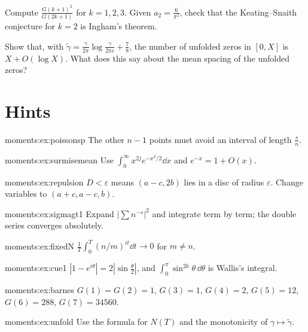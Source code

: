 \begin{exercise}[$\star$]\label{moments:ex:barnes}
Compute $\frac{G(k+1)^2}{G(2k+1)}$ for $k=1,2,3$. Given $a_2=\frac6{\pi^2}$, check that the Keating--Snaith conjecture for $k=2$ is Ingham's theorem.
\end{exercise}

\begin{exercise}[$\star\star$]\label{moments:ex:unfold}
Show that, with $\tilde\gamma=\frac\gamma{2\pi}\log\frac\gamma{2\pi e}+\frac78$, the number of unfolded zeros in $[0,X]$ is $X+O(\log X)$. What does this say about the
mean spacing of the unfolded zeros?
\end{exercise}

\section{Hints}

\begin{hint}{moments:ex:poissonsp}
The other $n-1$ points must avoid an interval of length $\frac sn$.
\end{hint}
\begin{hint}{moments:ex:surmisemean}
Use $\int_0^\infty x^{2j}e^{-x^2/2}\dd x$ and $e^{-x}=1+O(x)$.
\end{hint}
\begin{hint}{moments:ex:repulsion}
$D<\varepsilon$ means $(a-c,2b)$ lies in a disc of radius $\varepsilon$. Change variables to $(a+c,a-c,b)$.
\end{hint}
\begin{hint}{moments:ex:sigmagt1}
Expand $|\sum n^{-s}|^2$ and integrate term by term; the double series converges absolutely.
\end{hint}
\begin{hint}{moments:ex:fixedN}
$\frac1T\int_0^T(n/m)^{it}\dd t\to0$ for $m\ne n$.
\end{hint}
\begin{hint}{moments:ex:cue1}
$|1-e^{i\theta}|=2|\sin\frac\theta2|$, and $\int_0^\pi\sin^{2k}\theta\,\dd\theta$ is Wallis's integral.
\end{hint}
\begin{hint}{moments:ex:barnes}
$G(1)=G(2)=1$, $G(3)=1$, $G(4)=2$, $G(5)=12$, $G(6)=288$, $G(7)=34560$.
\end{hint}
\begin{hint}{moments:ex:unfold}
Use the formula for $N(T)$ and the monotonicity of $\gamma\mapsto\tilde\gamma$.
\end{hint}

